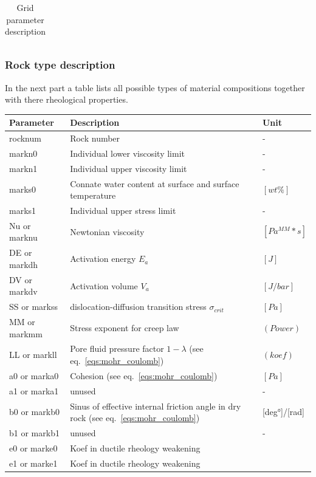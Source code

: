 \begin{table}[H]
\begin{table}[H]
\begin{tabular}{p{3cm} p{6cm} p{3cm} l}
\bottomrule
\end{tabular}
\caption{Grid parameter description}
\label{tbl:grid_parameter_description}
\end{table}

\subsubsection{Rock type description}

In the next part a table lists all possible types of material compositions together with there rheological properties.

\begin{table}[H]
\small
\centering
\begin{tabular}{l p{8cm} l}
\toprule
Parameter & Description & Unit\\
\midrule
rocknum & Rock number & - \\ 
markn0 & Individual lower viscosity limit & - \\ 
markn1 & Individual upper viscosity limit & - \\ 
marks0 & Connate water content at surface and surface temperature & $[wt\%]$ \\ 
marks1 & Individual upper stress limit & - \\ 
Nu or marknu & Newtonian viscosity & $[Pa^{MM}*s]$ \\ 
DE or markdh & Activation energy $E_a$ & $[J]$\\ 
DV or markdv & Activation volume $V_a$ & $[J/bar]$ \\ 
SS or markss & dislocation-diffusion transition stress $\sigma_{crit}$ & $[Pa]$ \\ 
MM or markmm & Stress exponent for creep law & $(Power)$ \\ 
LL or markll & Pore fluid pressure factor $1-\lambda$ (see eq.~\ref{eqs:mohr_coulomb}) & $(koef)$ \\ 
a0 or marka0 & Cohesion (see eq.~\ref{eqs:mohr_coulomb}) & $[Pa]$ \\
a1 or marka1 & unused & - \\
b0 or markb0 & Sinus of effective internal friction angle in dry rock (see eq.~\ref{eqs:mohr_coulomb}) & [deg°]/[rad] \\
b1 or markb1 & unused & - \\
e0 or marke0 & Koef in ductile rheology weakening \todo{???} & \todo{???} \\
e1 or marke1 & Koef in ductile rheology weakening \todo{???} & \todo{???} \\ 

\end{tabular}
\end{table}
\end{table}
